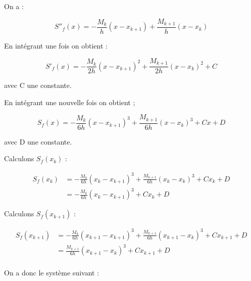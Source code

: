 \documentclass{article}
\begin{document}
\begin{enumerate}
\begin{enumerate}
    On a :

    \begin{equation*}
        S''_f(x) = - \frac{M_k}{h} (x - x_{k + 1}) + 
        \frac{M_{k + 1}}{h} (x - x_k)
    \end{equation*}

    En intégrant une fois on obtient :

    \begin{equation*}
      S'_f(x) = - \frac{M_k}{2h} (x - x_{k + 1})^2 + 
      \frac{M_{k + 1}}{2h} (x - x_k)^2 + C
    \end{equation*}

    avec C une constante. \newline \newline

    En intégrant une nouvelle fois on obtient ;

    \begin{equation*}
        S_f(x) = - \frac{M_k}{6h} (x - x_{k + 1})^3 + 
        \frac{M_{k + 1}}{6h} (x - x_k)^3 + Cx + D
    \end{equation*}

    avec D une constante. \newline \newline

    Calculons $S_f(x_k)$ :

    \begin{equation*}
      \begin{split}
        S_f(x_k) & = - \frac{M_k}{6h} (x_k - x_{k + 1})^3 + 
        \frac{M_{k + 1}}{6h} (x_k - x_k)^3 + Cx_k + D \\
        & = - \frac{M_k}{6h} (x_k - x_{k + 1})^3 + Cx_k + D
      \end{split}
    \end{equation*}

    Calculons $S_f(x_{k + 1})$ :

    \begin{equation*}
      \begin{split}
        S_f(x_{k + 1}) & = - \frac{M_k}{6h} (x_{k + 1} - x_{k + 1})^3 + 
        \frac{M_{k + 1}}{6h} (x_{k + 1} - x_k)^3 + Cx_{k + 1} + D \\
        & = \frac{M_{k + 1}}{6h} (x_{k + 1} - x_k)^3 + Cx_{k + 1} + D \\
      \end{split}
    \end{equation*}

    On a donc le système suivant :


\end{enumerate}
\end{enumerate}
\end{document}
